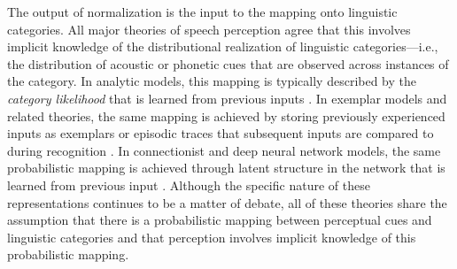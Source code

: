 \documentclass[
  11pt,
  man,floatsintext]{apa6}
\begin{document}
The output of normalization is the input to the mapping onto linguistic categories. All major theories of speech perception agree that this involves implicit knowledge of the distributional realization of linguistic categories---i.e., the distribution of acoustic or phonetic cues that are observed across instances of the category. In analytic models, this mapping is typically described by the \emph{category likelihood} that is learned from previous inputs \autocites[e.g., in the neighborhood activation model,][]{luce-pisoni1998}[shortlist B,][]{norris-mcqueen2008}[and other Bayesian inference models,][]{clayards2008,feldman2009,kleinschmidt-jaeger2015}. In exemplar models and related theories, the same mapping is achieved by storing previously experienced inputs as exemplars \autocites[e.g.,][]{johnson2006,pierrehumbert2001,wedel2006} or episodic traces \autocite{goldinger1996} that subsequent inputs are compared to during recognition \autocite[e.g., by means of \(k\)-nearest neighbor algorithms,][]{fix-hodges1989}. In connectionist and deep neural network models, the same probabilistic mapping is achieved through latent structure in the network that is learned from previous input \autocite{mcclelland-elman1986,magnuson2020}. Although the specific nature of these representations continues to be a matter of debate, all of these theories share the assumption that there is a probabilistic mapping between perceptual cues and linguistic categories \autocite[see also][ on the close computational relation between exemplar and Bayesian inference models]{shi2010} and that perception involves implicit knowledge of this probabilistic mapping.
\end{document}
